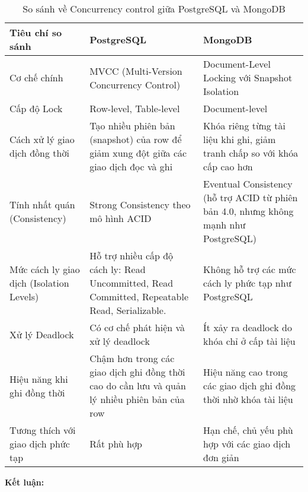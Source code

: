 \begin{table}[H]
    \centering
    \begin{tabular}{|L{3.2cm}|L{5.05cm}|L{5.05cm}|} \hline 
         \textbf{Tiêu chí so sánh }&  \textbf{PostgreSQL}&  \textbf{MongoDB}\\ \hline 
         Cơ chế chính & MVCC (Multi-Version Concurrency Control) & Document-Level Locking với Snapshot Isolation\\ \hline 
         Cấp độ Lock & Row-level, Table-level & Document-level\\ \hline 
         Cách xử lý giao dịch đồng thời & Tạo nhiều phiên bản (snapshot) của row để giảm xung đột giữa các giao dịch đọc và ghi & Khóa riêng từng tài liệu khi ghi, giảm tranh chấp so với khóa cấp cao hơn\\ \hline 
         Tính nhất quán (Consistency) & Strong Consistency theo mô hình ACID & Eventual Consistency (hỗ trợ ACID từ phiên bản 4.0, nhưng không mạnh như PostgreSQL)\\ \hline 
         Mức cách ly giao dịch (Isolation Levels) & Hỗ trợ nhiều cấp độ cách ly: Read Uncommitted, Read Committed, Repeatable Read, Serializable. & Không hỗ trợ các mức cách ly phức tạp như PostgreSQL\\ \hline
         Xử lý Deadlock & Có cơ chế phát hiện và xử lý deadlock & Ít xảy ra deadlock do khóa chỉ ở cấp tài liệu\\ \hline
         Hiệu năng khi ghi đồng thời & Chậm hơn trong các giao dịch ghi đồng thời cao do cần lưu và quản lý nhiều phiên bản của row & Hiệu năng cao trong các giao dịch ghi đồng thời nhờ khóa tài liệu\\ \hline
         Tương thích với giao dịch phức tạp & Rất phù hợp & Hạn chế, chủ yếu phù hợp với các giao dịch đơn giản\\ \hline
    \end{tabular}
    \caption{So sánh về Concurrency control giữa PostgreSQL và MongoDB}
    \label{tab:concurrency_control}
\end{table}
\indent \textbf{Kết luận:}
\newpage